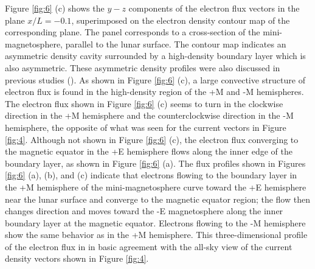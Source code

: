 \documentclass[draft,jgrga]{agutex2015}
\begin{document}
\begin{article}
Figure \ref{fig:6} (c) shows the $y-z$ components of the electron flux 
vectors in the plane $x/L=-0.1$, 
superimposed on the electron density contour map of the corresponding plane.
The panel corresponds to a cross-section of the mini-magnetosphere, 
parallel to the lunar surface.
The contour map indicates an asymmetric density cavity 
surrounded by a high-density boundary layer which is also asymmetric.
These asymmetric density profiles were also discussed in previous studies
(\cite{Deca2014}).
As shown in Figure \ref{fig:6} (c),
a large convective structure of electron flux is found 
in the high-density region of the +M and -M hemispheres.
%
%
The electron flux shown in Figure \ref{fig:6} (c) seems to turn 
in the clockwise direction in the +M hemisphere and the 
counterclockwise direction in the -M hemisphere, the opposite of what was seen for the current vectors in Figure \ref{fig:4}.
%
Although not shown in Figure \ref{fig:6} (c), 
the electron flux converging to the magnetic equator in
the +E hemisphere flows along the inner edge of the boundary layer, 
as shown in Figure \ref{fig:6} (a).
The flux profiles shown in Figures \ref{fig:6} (a), (b), and (c) indicate 
that electrons flowing 
to the boundary layer in the +M hemisphere of the mini-magnetosphere
curve toward the +E hemisphere 
near the lunar surface and converge to the magnetic equator region; 
the flow then changes direction and moves toward the -E magnetosphere
along the inner boundary layer at the magnetic equator.
Electrons flowing to the -M hemisphere show the
same behavior as in the +M hemisphere.
This three-dimensional profile of the electron flux in in basic agreement 
with the all-sky view of the current density vectors 
shown in Figure \ref{fig:4}.


\end{article}
\end{document}
